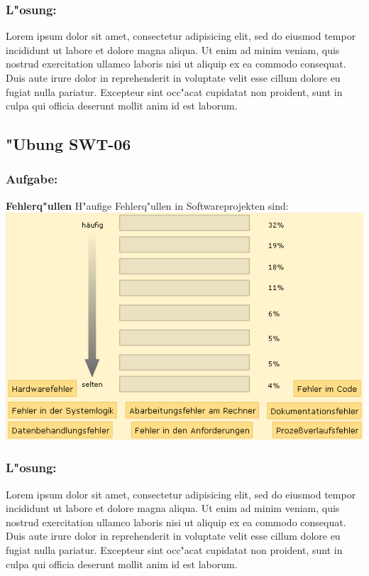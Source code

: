\subsubsection*{L"osung:}
Lorem ipsum dolor sit amet, consectetur adipisicing elit, sed do eiusmod tempor incididunt ut labore et dolore magna aliqua. Ut enim ad minim veniam, quis nostrud exercitation ullamco laboris nisi ut aliquip ex ea commodo consequat. Duis aute irure dolor in reprehenderit in voluptate velit esse cillum dolore eu fugiat nulla pariatur. Excepteur sint occ"acat cupidatat non proident, sunt in culpa qui officia deserunt mollit anim id est laborum.

\newpage
\subsection{"Ubung SWT-06}
\subsubsection*{Aufgabe:}

\begin{framed}
\textbf{Fehlerq"ullen}
\smallbreak
H"aufige Fehlerq"ullen in Softwareprojekten sind:
\bigbreak
\includegraphics[width=1.0\textwidth]{./images/ueb01-06.png}
\end{framed}
\bigbreak
\bigbreak
\subsubsection*{L"osung:}
Lorem ipsum dolor sit amet, consectetur adipisicing elit, sed do eiusmod tempor incididunt ut labore et dolore magna aliqua. Ut enim ad minim veniam, quis nostrud exercitation ullamco laboris nisi ut aliquip ex ea commodo consequat. Duis aute irure dolor in reprehenderit in voluptate velit esse cillum dolore eu fugiat nulla pariatur. Excepteur sint occ"acat cupidatat non proident, sunt in culpa qui officia deserunt mollit anim id est laborum.


